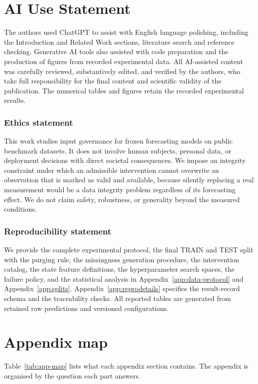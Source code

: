 \documentclass{article}
\begin{document}
\section*{AI Use Statement}
\label{sec:ai-statement}
The authors used ChatGPT to assist with English language polishing, including the
Introduction and Related Work sections, literature search and reference checking.
Generative AI tools also assisted with code preparation and the production of figures
from recorded experimental data. All AI-assisted content was carefully reviewed,
substantively edited, and verified by the authors, who take full responsibility for
the final content and scientific validity of the publication. The numerical tables
and figures retain the recorded experimental results.

\subsubsection*{Ethics statement}
This work studies input governance for frozen forecasting models on public benchmark datasets.
It does not involve human subjects, personal data, or deployment decisions with direct
societal consequences. We impose an integrity constraint under which an admissible
intervention cannot overwrite an observation that is marked as valid and available, because
silently replacing a real measurement would be a data integrity problem regardless of its
forecasting effect. We do not claim safety, robustness, or generality beyond the measured
conditions.

\subsubsection*{Reproducibility statement}
We provide the complete experimental protocol, the final TRAIN and TEST split with the
purging rule, the missingness generation procedure, the intervention catalog, the state
feature definitions, the hyperparameter search spaces, the failure policy, and the statistical
analysis in Appendix~\ref{app:data-protocol} and Appendix~\ref{app:splits}.
Appendix~\ref{app:reprodetails} specifies the result-record schema and the traceability checks.
All reported tables are generated from retained raw predictions and versioned configurations.




\appendix

\newpage

\section*{Appendix map}
\label{app:map}
Table~\ref{tab:app-map} lists what each appendix section contains. The appendix is organised
by the question each part answers.
\end{document}
